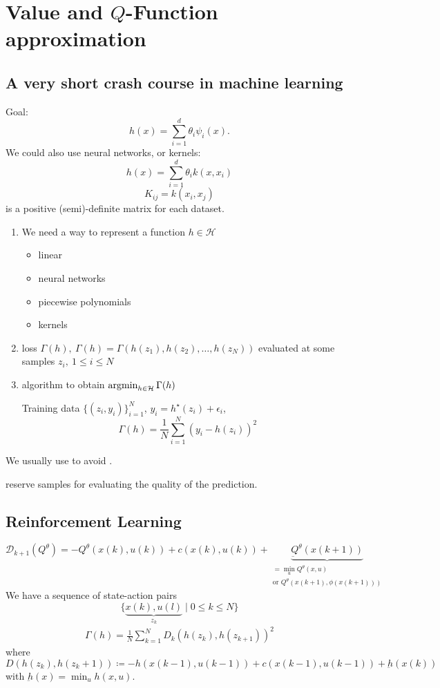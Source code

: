 \chapter{Value and \(Q\)-Function approximation}

\section{A very short crash course in machine learning}


Goal: \[h(x)=\sum_{i=1}^d \theta_i \psi_i(x).\]
We could also use neural networks, or kernels: 
\[h(x)=\sum_{i=1}^d\theta_ik(x,x_i)\]
\[K_{ij}=k(x_i,x_j)\]
is a positive (semi)-definite matrix for each dataset.

\begin{enumerate}
    \item We need a way to represent a function \(h\in \mathcal{H}\)\begin{itemize}
        \item linear
        \item neural networks 
        \item piecewise polynomials 
        \item kernels
    \end{itemize}
    \item loss \(\Gamma(h),\ \Gamma(h)=\Gamma(h(z_1),h(z_2),\dots,h(z_N))\) evaluated at some samples \(z_i,\ 1\leq i\leq N\)
    \item algorithm to obtain \(\operatorname*{\text{argmin}}_{h\in \mathcal{H}}\Gamma(h)\)

        Training data \(\{(z_i,y_i)\}_{i=1}^N\), \(y_i=h^\star(z_i)+\epsilon_i\),
        \[\Gamma(h)=\frac{1}{N}\sum_{i=1}^N \left(y_i-h(z_i)\right)^2\]
\end{enumerate}
We usually use  to avoid .

 reserve samples for evaluating the quality of the prediction. 

\section{Reinforcement Learning}
\[\mathcal{D}_{k+1}(Q^\theta)=-Q^\theta(x(k),u(k))+c(x(k),u(k))+\underbrace{\underbar{Q}^\theta(x(k+1))}_{\substack{=\min_u Q^\theta(x,u)\\ \text{or }Q^\theta(x(k+1),\phi(x(k+1)))}}\]
We have a sequence of state-action pairs 
\[\{\underbrace{x(k),u(l)}_{z_k}\mid 0\leq k\leq N\}\]
\begin{align*}
    \Gamma(h)=\frac{1}{N}\sum_{k=1}^{N}D_k(h(z_k),h(z_{k+1}))^2
\end{align*}
where \[D(h(z_k),h(z_k+1))\coloneqq -h(x(k-1),u(k-1))+c(x(k-1),u(k-1))+\underbar{h}(x(k))\]
with \(\underbar{h}(x)=\min_{u}h(x,u)\).

